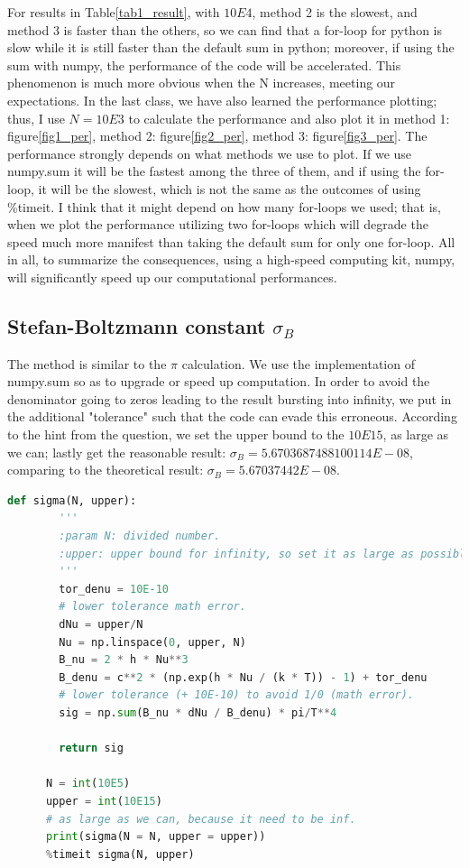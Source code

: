 \documentclass[12pt]{article}
\begin{document}
    For results in Table\ref{tab1_result}, with $10E4$, method 2 is the slowest, and method 3 is faster than the others, so we can find that a for-loop for python is slow while it is still faster than the default sum in python; moreover, if using the sum with numpy, the performance of the code will be accelerated. This phenomenon is much more obvious when the N increases, meeting our expectations. In the last class, we have also learned the performance plotting; thus, I use $N = 10E3$ to calculate the performance and also plot it in method 1: figure\ref{fig1_per}, method 2: figure\ref{fig2_per}, method 3: figure\ref{fig3_per}. The performance strongly depends on what methods we use to plot. If we use {\ttfamily numpy.sum} it will be the fastest among the three of them, and if using the for-loop, it will be the slowest, which is not the same as the outcomes of using {\ttfamily \%timeit}. I think that it might depend on how many for-loops we used; that is, when we plot the performance utilizing two for-loops which will degrade the speed much more manifest than taking the default {\ttfamily sum} for only one for-loop. All in all, to summarize the consequences, using a high-speed computing kit, numpy, will significantly speed up our computational performances.
  
  \subsection{Stefan-Boltzmann constant $\sigma_{B}$}
    The method is similar to the $\pi$ calculation. We use the implementation of {\ttfamily numpy.sum} so as to upgrade or speed up computation. In order to avoid the denominator going to zeros leading to the result bursting into infinity, we put in the additional "tolerance" such that the code can evade this erroneous. According to the hint from the question, we set the upper bound to the $10E15$, as large as we can; lastly get the reasonable result: $\sigma_{B} = 5.6703687488100114E-08$, comparing to the theoretical result: $\sigma_{B} = 5.67037442E-08$.
    
    \begin{lstlisting}[language={Python}, caption={The Stefan-Boltzmann constant $\sigma_{B}$ calculation, performance = $15.6ms \pm 312 \mu s$.}]
        def sigma(N, upper):
        '''
        :param N: divided number.
        :upper: upper bound for infinity, so set it as large as possible.
        '''
        tor_denu = 10E-10
        # lower tolerance math error.
        dNu = upper/N
        Nu = np.linspace(0, upper, N)
        B_nu = 2 * h * Nu**3
        B_denu = c**2 * (np.exp(h * Nu / (k * T)) - 1) + tor_denu
        # lower tolerance (+ 10E-10) to avoid 1/0 (math error).
        sig = np.sum(B_nu * dNu / B_denu) * pi/T**4
      
        return sig
      
      N = int(10E5)
      upper = int(10E15) 
      # as large as we can, because it need to be inf.
      print(sigma(N = N, upper = upper))
      %timeit sigma(N, upper)
    \end{lstlisting}
\end{document}
